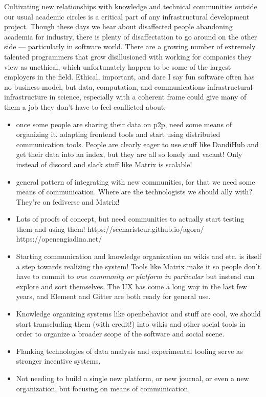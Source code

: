 \documentclass[10pt]{article}
\begin{document}
\begin{multicols}{2}
Cultivating new relationships with knowledge and technical communities
outside our usual academic circles is a critical part of any
infrastructural development project. Though these days we hear about
disaffected people abandoning academia for industry, there is plenty of
disaffectation to go around on the other side --- particularly in
software world. There are a growing number of extremely talented
programmers that grow disillusioned with working for companies they view
as unethical, which unfortunately happen to be some of the largest
employers in the field. Ethical, important, and dare I say fun software
often has no business model, but data, computation, and communications
infrastructural infrastructure in science, especially with a coherent
frame could give many of them a job they don't have to feel conflicted
about.

\begin{itemize}

\item
  once some people are sharing their data on p2p, need some means of
  organizing it. adapting frontend tools and start using distributed
  communication tools. People are clearly eager to use stuff like
  DandiHub and get their data into an index, but they are all so lonely
  and vacant! Only instead of discord and slack stuff like Matrix is
  scalable!
\item
  general pattern of integrating with new communities, for that we need
  some means of communication. Where are the technologists we should
  ally with? They're on fediverse and Matrix!
\item
  Lots of proofs of concept, but need communities to actually start
  testing them and using them! https://scenaristeur.github.io/agora/
  https://openengiadina.net/
\item
  Starting communication and knowledge organization on wikis and etc. is
  itself a step towards realizing the system! Tools like Matrix make it
  so people don't have to commit to \emph{one community or platform in
  particular} but instead can explore and sort themselves. The UX has
  come a long way in the last few years, and Element and Gitter are both
  ready for general use.
\item
  Knowledge organizing systems like openbehavior and stuff are cool, we
  should start transcluding them (with credit!) into wikis and other
  social tools in order to organize a broader scope of the software and
  social scene.
\item
  Flanking technologies of data analysis and experimental tooling serve
  as stronger incentive systems.
\item
  Not needing to build a single new platform, or new journal, or even a
  new organization, but focusing on means of communication.
\end{itemize}


\end{multicols}
\end{document}
